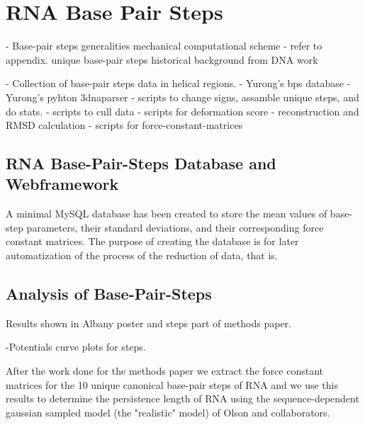 \chapter{RNA Base Pair Steps}
\label{basepairsteps} 


- Base-pair steps generalities
mechanical computational scheme - refer to appendix.
unique base-pair steps
historical background from DNA work


- Collection of base-pair steps data in helical regions.
  - Yurong's bps database
  - Yurong's pyhton 3dnaparser
  - scripts to change signs, assamble unique steps, and do stats.
  - scripts to cull data
  - scripts for deformation score
  - reconstruction and RMSD calculation
  - scripts for force-constant-matrices




\section{RNA Base-Pair-Steps Database and Webframework}
A minimal MySQL database has been  created to store the mean values of
base-step   parameters,   their   standard   deviations,   and   their
corresponding  force constant  matrices. The  purpose of  creating the
database is for  later automatization of the process  of the reduction
of data, that is.

\section{Analysis of Base-Pair-Steps}
Results shown in Albany poster and steps part of methods paper.


-Potentials curve plots for steps.



After the work done for the methods paper we extract the force
constant matrices for the 10 unique canonical base-pair steps of RNA
and we use this results to determine the persistence length of RNA
using the sequence-dependent gaussian sampled model (the "realistic"
model) of Olson and collaborators.

